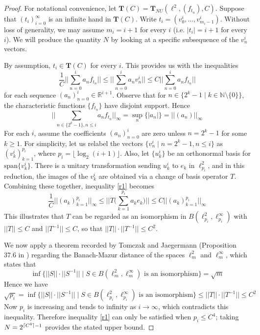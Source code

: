 \documentclass{article}
\newcommand{\spn}{\text{span}}
\newcommand{\N}{\mathbb N}
\newcommand{\R}{\mathbb R}
\newcommand{\floor}[1]{\lfloor #1 \rfloor}
\DeclarePairedDelimiter{\ceil}{\lceil}{\rceil}
\begin{document}
\begin{proof}
For notational convenience, let $\textbf{T}(C) = \textbf{T}_{NU}(\ell^2, (f_{t_n}), C)$. Suppose that $(t_i)_{i=0}^\infty$ is an infinite hand in $\textbf{T}(C)$. Write $t_i = (v_0^i,\ldots, v_{m_i-1}^i)$. Without loss of generality, we may assume $m_i = i+1$ for every $i$ (i.e. $|t_i|=i+1$ for every $i$). We will produce the quantity $N$ by looking at a specific subsequence of the $v_n^i$ vectors.

By assumption, $t_i\in \textbf{T}(C)$ for every $i$. This provides us with the inequalities
\begin{equation}\label{r1}
\frac{1}{C}\bigg|\bigg|\sum_{n=0}^{i} a_n f_{t_n}\bigg|\bigg|\leq \bigg|\bigg|\sum_{n=0}^{i} a_n v_n^i\bigg|\bigg|\leq C\bigg|\bigg|\sum_{n=0}^{i} a_n f_{t_n}\bigg|\bigg|
\end{equation}
for each sequence $(a_n)_{n=0}^i\in \R^{i+1}$. Observe that for $n\in\{2^k-1\mid k\in\N\setminus\{0\}\}$, the characteristic functions $\{f_{t_n}\}$ have disjoint support. Hence
\begin{equation*}
\bigg|\bigg|\sum_{n\in\{2^k-1\}, n\leq i} a_n f_{t_n}\bigg|\bigg|_{\infty} = \sup_n\{|a_n|\} = ||(a_n)||_\infty
\end{equation*}
For each $i$, assume the coefficients $(a_n)_{n=0}^i$ are zero unless $n = 2^k - 1$ for some $k\geq 1$. For simplicity, let us relabel the vectors $\{v_n^i\mid n = 2^k - 1, n\leq i\}$ as $(v_k^i)_{k=1}^{p_i}$, where $p_i = \floor{\log_2(i+1)}$. Also, let $\{u_k^i\}$ be an orthonormal basis for $\spn\{v_k^i\}$. There is a unitary transformation sending $u_k^i$ to $e_k$ in $\ell^2_{p_i}$, and in this reduction, the images of the $v_k^i$ are obtained via a change of basis operator $T$. Combining these together, inequality \ref{r1} becomes
\begin{equation}\label{r2}
\frac{1}{C}||(a_k)_{k=1}^{p_i}||_\infty\leq \bigg|\bigg|T\bigg(\sum_{k=1}^{p_i} a_k e_k\bigg)\bigg|\bigg|\leq C||(a_k)_{k=1}^{p_i}||_\infty
\end{equation}
This illustrates that $T$ can be regarded as an isomorphism in $B(\ell_{p_i}^2, \ell_{p_i}^\infty)$ with $||T||\leq C$ and $||T^{-1}||\leq C$, so that $||T||\cdot||T^{-1}||\leq C^2$.

We now apply a theorem recorded by Tomczak and Jaegermann (Proposition 37.6 in \cite{TJ}) regarding the Banach-Mazur distance of the spaces $\ell^2_m$ and $\ell^\infty_m$, which states that
\begin{equation*}
\inf\{||S||\cdot||S^{-1}||\mid S \in B(\ell^2_m,\ell^\infty_m) \text{ is an isomorphism}\} = \sqrt{m}
\end{equation*}
Hence we have
\begin{equation*}
\sqrt{p_i} = \inf\{||S||\cdot||S^{-1}||\mid S \in B(\ell^2_{p_i},\ell^\infty_{p_i}) \text{ is an isomorphism}\} \leq ||T||\cdot||T^{-1}|| \leq C^2
\end{equation*}
Now $p_i$ is increasing and tends to infinity as $i\rightarrow\infty$, which contradicts this inequality. Therefore inequality \ref{r1} can only be satisfied when $p_i\leq C^4$; taking $N = 2^{\ceil{C^4}-1}$ provides the stated upper bound.
\end{proof}
\end{document}
